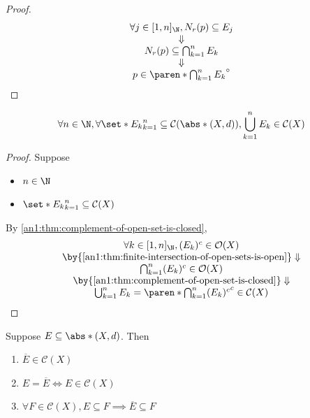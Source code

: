 \begin{proof}
\[\begin{array}{c}
      \forall j \in [1, n]_{\N}, N_{r}(p) \subseteq E_{j}                                                     \\
      \Downarrow                                                                                              \\
      N_{r}(p) \subseteq \bigcap_{k = 1}^{n} E_{k}                                                            \\
      \Downarrow                                                                                              \\
      p \in \paren*{\bigcap_{k = 1}^{n} E_{k}}^{\circ}
    \end{array}
  \]
\end{proof}

\begin{corollary} \label{an1:cor:finite-union-of-closed-sets-is-closed}
  \[
    \forall n \in \N, \forall \set*{E_{k}}_{k = 1}^{n} \subseteq \mathcal{C}(\abs*{(X, d)}),
    \bigcup_{k = 1}^{n} E_{k} \in \mathcal{C}(X)
  \]
\end{corollary}

\begin{proof}
  Suppose
  \begin{itemize}
    \item $n \in \N$
    \item $\set*{E_{k}}_{k = 1}^{n} \subseteq \mathcal{C}(X)$
  \end{itemize}
  By \cref{an1:thm:complement-of-open-set-is-closed},
  \[
    \begin{array}{c}
      \forall k \in [1, n]_{\N}, (E_{k})^{c} \in \mathcal{O}(X)               \\
      \by{\Cref{an1:thm:finite-intersection-of-open-sets-is-open}} \Downarrow \\
      \bigcap_{k = 1}^{n} (E_{k})^{c} \in \mathcal{O}(X)                      \\
      \by{\Cref{an1:thm:complement-of-open-set-is-closed}} \Downarrow         \\
      \bigcup_{k = 1}^{n} E_{k} = \paren*{\bigcap_{k = 1}^{n} (E_{k})^{c}}^{c} \in \mathcal{C}(X)
    \end{array}
  \]
\end{proof}

\begin{theorem} \label{an1:thm:properties-of-closure}
  Suppose $E \subseteq \abs*{(X, d)}$. Then
  \begin{enumerate}[label=\textbf{(\Alph*)}]
    \item $\overline{E} \in \mathcal{C}(X)$
    \item $E = \overline{E} \iff E \in \mathcal{C}(X)$
    \item $\forall F \in \mathcal{C}(X), E \subseteq F \implies \overline{E} \subseteq F$
  \end{enumerate}
\end{theorem}

